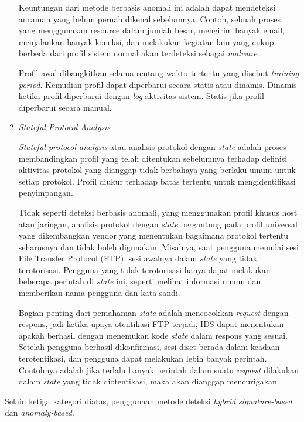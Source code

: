 \begin{enumerate}
      Keuntungan dari metode berbasis anomali ini adalah dapat mendeteksi ancaman yang belum pernah dikenal sebelumnya. Contoh, sebuah proses yang menggunakan resource dalam jumlah besar, mengirim banyak email, menjalankan banyak koneksi, dan melakukan kegiatan lain yang cukup berbeda dari profil sistem normal akan terdeteksi sebagai \emph{malware}.

      Profil awal dibangkitkan selama rentang waktu tertentu yang disebut \emph{training period}. Kemudian profil dapat diperbarui secara statis atau dinamis. Dinamis ketika profil diperbarui dengan \emph{log} aktivitas sistem. Statis jika profil diperbarui secara manual.

      \item
      \emph{Stateful Protocol Analysis}

      \emph{Stateful protocol analysis} atau analisis protokol dengan \emph{state} adalah proses membandingkan profil yang telah ditentukan sebelumnya terhadap definisi aktivitas protokol yang dianggap tidak berbahaya yang berlaku umum untuk setiap protokol. Profil diukur terhadap batas tertentu untuk mengidentifikasi penyimpangan. 

      Tidak seperti deteksi berbasis anomali, yang menggunakan profil khusus host atau jaringan, analisis protokol dengan \emph{state} bergantung pada profil universal yang dikembangkan vendor yang menentukan bagaimana protokol tertentu seharusnya dan tidak boleh digunakan. Misalnya, saat pengguna memulai sesi File Transfer Protocol (FTP), sesi awalnya dalam \emph{state} yang tidak terotorisasi. Pengguna yang tidak terotorisasi hanya dapat melakukan beberapa perintah di \emph{state} ini, seperti melihat informasi umum dan memberikan nama pengguna dan kata sandi. 

      Bagian penting dari pemahaman \emph{state} adalah mencocokkan \emph{request} dengan respons, jadi ketika upaya otentikasi FTP terjadi, IDS dapat menentukan apakah berhasil dengan menemukan kode \emph{state} dalam respons yang sesuai. Setelah pengguna berhasil dikonfirmasi, sesi diset berada dalam keadaan terotentikasi, dan pengguna dapat melakukan lebih banyak perintah. Contohnya adalah jika terlalu banyak perintah dalam suatu \emph{request} dilakukan dalam \emph{state} yang tidak diotentikasi, maka akan dianggap mencurigakan. 

    \end{enumerate}

    Selain ketiga kategori diatas, penggunaan metode deteksi \emph{hybrid} \emph{signature-based} dan \emph{anomaly-based}. 

